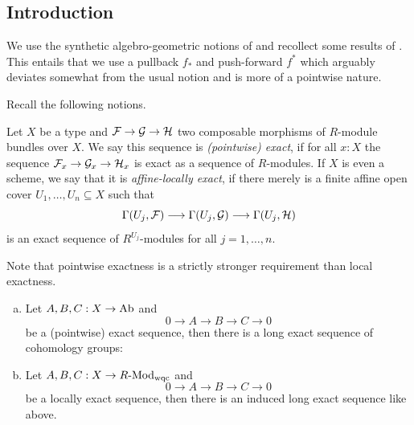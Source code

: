 \subsection{Introduction}

We use the synthetic algebro-geometric notions of \cite{draft}
and recollect some results of \cite{cech-draft}.
This entails that we use a pullback $f_\ast$ and push-forward $f^\ast$ which arguably deviates somewhat from the usual notion and is more of a pointwise nature.

Recall the following notions.

\begin{definition}
  Let $X$ be a type and $\mathcal{F} \to \mathcal{G} \to \mathcal{H}$ two composable morphisms of $R$-module bundles over $X$.
  We say this sequence is \emph{(pointwise) exact}, if for all $x:X$ the sequence $\mathcal{F}_x \to \mathcal{G}_x \to \mathcal{H}_x$ is exact as a sequence of $R$-modules.
  If $X$ is even a scheme, we say that it is \emph{affine-locally exact}, if there merely is a finite affine open cover $U_1,\dots,U_n \subseteq X$ such that
  \[
    \Gamma(U_j,\mathcal{F}) \longrightarrow \Gamma(U_j,\mathcal{G}) \longrightarrow \Gamma(U_j,\mathcal{H})
  \]
  is an exact sequence of $R^{U_j}$-modules for all $j=1,\dots,n$.
\end{definition}

Note that pointwise exactness is a strictly stronger requirement than local exactness.

\begin{theorem}
  \begin{enumerate}[(a)]
  \item Let $A,B,C:X\to \operatorname{Ab}$ and
    \[
    0\to A\to B\to C\to 0
    \]
    be a (pointwise) exact sequence, then there is a long exact sequence of cohomology groups:
    \begin{center}
    \end{center}
  \item Let $A,B,C:X\to R\text{-}\mathrm{Mod}_{\mathrm{wqc}}$ and
    \[
    0\to A\to B\to C\to 0
    \]
    be a locally exact sequence,
    then there is an induced long exact sequence like above.
  \end{enumerate}
\end{theorem}

